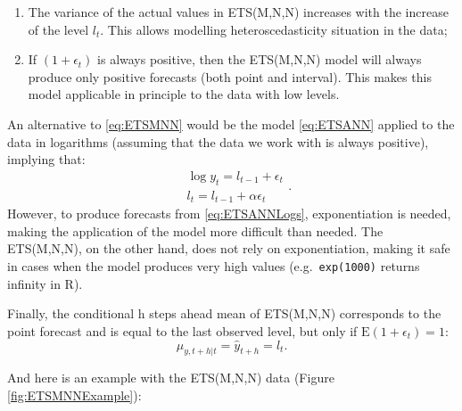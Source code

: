 \documentclass[]{book}
\newenvironment{Shaded}{\begin{snugshade}}{\end{snugshade}}
\newcommand{\DataTypeTok}[1]{\textcolor[rgb]{0.13,0.29,0.53}{#1}}
\newcommand{\DecValTok}[1]{\textcolor[rgb]{0.00,0.00,0.81}{#1}}
\newcommand{\FloatTok}[1]{\textcolor[rgb]{0.00,0.00,0.81}{#1}}
\newcommand{\KeywordTok}[1]{\textcolor[rgb]{0.13,0.29,0.53}{\textbf{#1}}}
\newcommand{\NormalTok}[1]{#1}
\newcommand{\OperatorTok}[1]{\textcolor[rgb]{0.81,0.36,0.00}{\textbf{#1}}}
\newcommand{\OtherTok}[1]{\textcolor[rgb]{0.56,0.35,0.01}{#1}}
\newcommand{\StringTok}[1]{\textcolor[rgb]{0.31,0.60,0.02}{#1}}
\providecommand{\tightlist}{%
  \setlength{\itemsep}{0pt}\setlength{\parskip}{0pt}}
\theoremstyle{definition}
\theoremstyle{definition}
\theoremstyle{definition}
\theoremstyle{definition}
\theoremstyle{remark}
\begin{document}
\begin{enumerate}
\def\labelenumi{\arabic{enumi}.}
\tightlist
\item
  The variance of the actual values in ETS(M,N,N) increases with the increase of the level \(l_{t}\). This allows modelling heteroscedasticity situation in the data;
\item
  If \((1+\epsilon_t)\) is always positive, then the ETS(M,N,N) model will always produce only positive forecasts (both point and interval). This makes this model applicable in principle to the data with low levels.
\end{enumerate}

An alternative to \eqref{eq:ETSMNN} would be the model \eqref{eq:ETSANN} applied to the data in logarithms (assuming that the data we work with is always positive), implying that:
\begin{equation}
  \begin{aligned}
    & \log y_{t} = l_{t-1} + \epsilon_t \\
    & l_t = l_{t-1} + \alpha \epsilon_t
  \end{aligned} .
  \label{eq:ETSANNLogs}
\end{equation}
However, to produce forecasts from \eqref{eq:ETSANNLogs}, exponentiation is needed, making the application of the model more difficult than needed. The ETS(M,N,N), on the other hand, does not rely on exponentiation, making it safe in cases when the model produces very high values (e.g.~\texttt{exp(1000)} returns infinity in R).

Finally, the conditional h steps ahead mean of ETS(M,N,N) corresponds to the point forecast and is equal to the last observed level, but only if \(\mathrm{E}(1+\epsilon_t)=1\):
\begin{equation}
    \mu_{y,t+h|t} = \hat{y}_{t+h} = l_{t} .
  \label{eq:ETSMNNForecast}
\end{equation}

And here is an example with the ETS(M,N,N) data (Figure \ref{fig:ETSMNNExample}):

\begin{Shaded}
\end{Shaded}
\end{document}
